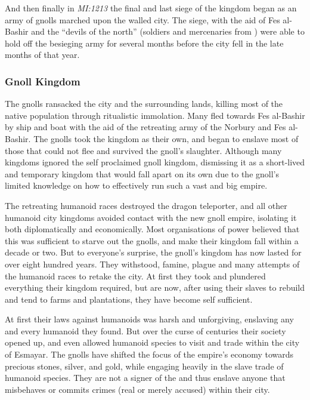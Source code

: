 And then finally in \emph{MI:1213} the final and last siege of the kingdom
began as an army of gnolls marched upon the walled city. The siege, with the
aid of Fes al-Bashir and the ``devils of the north'' (soldiers and mercenaries
from ) were able to hold off the besieging army for
several months before the city fell in the late months of that year.

\subsubsection{Gnoll Kingdom}

The gnolls ransacked the city and the surrounding lands, killing most of the
native population through ritualistic immolation. Many fled towards Fes
al-Bashir by ship and boat with the aid of the retreating army of the Norbury
and Fes al-Bashir. The gnolls took the kingdom as their own, and began to
enslave most of those that could not flee and survived the gnoll's
slaughter. Although many kingdoms ignored the self proclaimed gnoll kingdom,
dismissing it as a short-lived and temporary kingdom that would fall apart on
its own due to the gnoll's limited knowledge on how to effectively run such a
vast and big empire.

The retreating humanoid races destroyed the dragon teleporter, and all other
humanoid city kingdoms avoided contact with the new gnoll empire, isolating it
both diplomatically and economically. Most organisations of power believed
that this was sufficient to starve out the gnolls, and make their kingdom fall
within a decade or two. But to everyone's surprise, the gnoll's kingdom has
now lasted for over eight hundred years. They withstood, famine, plague and
many attempts of the humanoid races to retake the city. At first they took and
plundered everything their kingdom required, but are now, after using their
slaves to rebuild and tend to farms and plantations, they have become self
sufficient.

At first their laws against humanoids was harsh and unforgiving, enslaving any
and every humanoid they found. But over the curse of centuries their society
opened up, and even allowed humanoid species to visit and trade within the
city of Esmayar. The gnolls have shifted the focus of the empire's economy
towards precious stones, silver, and gold, while engaging heavily in the slave
trade of humanoid species. They are not a signer of the  and thus enslave anyone that misbehaves or commits crimes (real or
merely accused) within their city.

